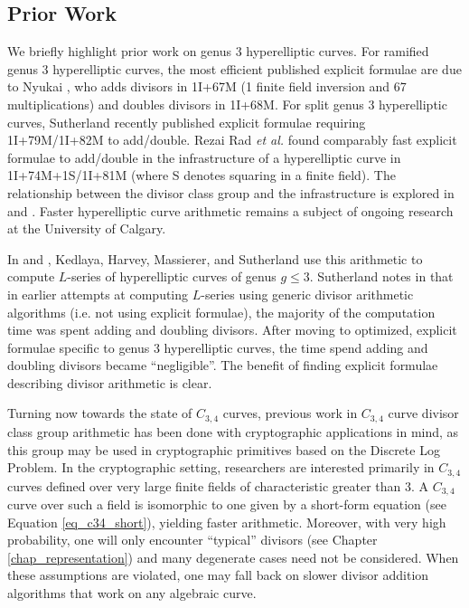 
\subsection{Prior Work}

We briefly highlight prior work on genus 3 hyperelliptic curves.
For ramified genus 3 hyperelliptic curves, the most efficient published explicit formulae
are due to Nyukai \cite{nyukai06-1} \cite{nyukai06-2},
who adds divisors in 1I+67M (1 finite field inversion and 67 multiplications) and doubles divisors in 1I+68M.
For split genus 3 hyperelliptic curves, Sutherland \cite{sutherland18} recently published explicit formulae
requiring 1I+79M/1I+82M to add/double.
Rezai Rad \emph{et al.} \cite{rezairad16} \cite{rezairad19} found comparably fast explicit formulae to add/double
in the infrastructure of a hyperelliptic curve in 1I+74M+1S/1I+81M
(where S denotes squaring in a finite field).
The relationship between the divisor class group and the infrastructure is explored in \cite{rezairad16} and \cite{rezairad19}.
Faster hyperelliptic curve arithmetic remains a subject of ongoing research at the University of Calgary.

In \cite{kedlaya08} and \cite{harvey16}, Kedlaya, Harvey, Massierer, and Sutherland use this arithmetic to compute $L$-series of hyperelliptic curves of genus $g \leq 3$.
Sutherland notes in \cite{sutherland18} that in earlier attempts at computing $L$-series using generic divisor arithmetic algorithms (i.e. not using explicit formulae),
the majority of the computation time was spent adding and doubling divisors.
After moving to optimized, explicit formulae specific to genus 3 hyperelliptic curves, the time spend adding and doubling divisors became ``negligible''.
The benefit of finding explicit formulae describing divisor arithmetic is clear.

Turning now towards the state of $C_{3,4}$ curves, previous work in $C_{3,4}$ curve divisor class group arithmetic
has been done with cryptographic applications in mind, as this group may be used in cryptographic primitives based on the Discrete Log Problem.
In the cryptographic setting, researchers are interested primarily in $C_{3,4}$ curves defined over very large finite fields
of characteristic greater than 3.
A $C_{3,4}$ curve over such a field is isomorphic to one given by a short-form equation (see Equation \ref{eq_c34_short}), yielding faster arithmetic.
Moreover, with very high probability, one will only encounter ``typical'' divisors (see Chapter \ref{chap_representation})
and many degenerate cases need not be considered.
When these assumptions are violated, one may fall back on slower divisor addition algorithms that work on any algebraic curve.

